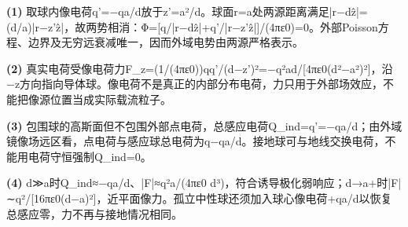 \par\noindent\textbf{(1)} 取球内像电荷q'=−qa/d放于z'=a²/d。球面r=a处两源距离满足|r−dẑ|=(d/a)|r−z'ẑ|，故两势相消：Φ=[q/|r−dẑ|+q'/|r−z'ẑ|]/(4πε0)=0。外部Poisson方程、边界及无穷远衰减唯一，因而外域电势由两源严格表示。
\par\noindent\textbf{(2)} 真实电荷受像电荷力F\_z=(1/(4πε0))qq'/(d−z')²=−q²ad/[4πε0(d²−a²)²]，沿−z方向指向导体球。像电荷不是真正的内部分布电荷，力只用于外部场效应，不能把像源位置当成实际载流粒子。
\par\noindent\textbf{(3)} 包围球的高斯面但不包围外部点电荷，总感应电荷Q\_ind=q'=−qa/d；由外域镜像场远区看，点电荷与感应球总电荷为q−qa/d。接地球可与地线交换电荷，不能用电荷守恒强制Q\_ind=0。
\par\noindent\textbf{(4)} d≫a时Q\_ind≈−qa/d、|F|≈q²a/(4πε0 d³)，符合诱导极化弱响应；d→a+时|F|∼q²/[16πε0(d−a)²]，近平面像力。孤立中性球还须加入球心像电荷+qa/d以恢复总感应零，力不再与接地情况相同。
